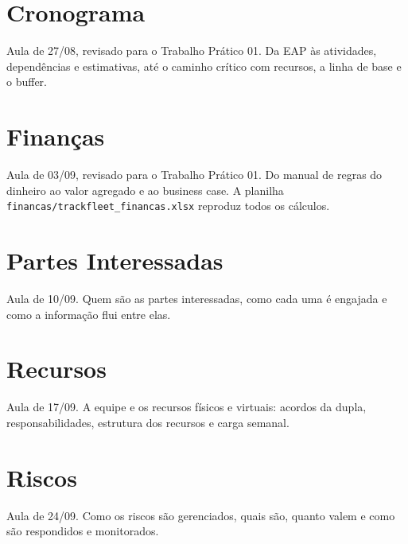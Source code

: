 \documentclass[11pt,a4paper]{report}
\newcommand{\subdocumento}[1]{\begingroup\let\section\subsection\let\subsection\subsubsection\endgroup}
\begin{document}


\chapter{Cronograma}\label{cap:cronograma}
\noindent Aula de 27/08, revisado para o Trabalho Prático 01. Da EAP às atividades, dependências e estimativas, até o caminho crítico com recursos, a linha de base e o buffer.



\chapter{Finanças}\label{cap:financas}
\noindent Aula de 03/09, revisado para o Trabalho Prático 01. Do manual de regras do dinheiro ao valor agregado e ao business case. A planilha \texttt{financas/trackfleet\_financas.xlsx} reproduz todos os cálculos.



\chapter{Partes Interessadas}\label{cap:partes}
\noindent Aula de 10/09. Quem são as partes interessadas, como cada uma é engajada e como a informação flui entre elas.
\subdocumento{../partes_interessadas/registro_das_partes_interessadas}
\subdocumento{../partes_interessadas/plano_de_engajamento}
\subdocumento{../partes_interessadas/plano_de_comunicacoes}

\chapter{Recursos}\label{cap:recursos}
\noindent Aula de 17/09. A equipe e os recursos físicos e virtuais: acordos da dupla, responsabilidades, estrutura dos recursos e carga semanal.
\subdocumento{../recursos/termo_da_equipe}
\subdocumento{../recursos/matriz_raci}
\subdocumento{../recursos/estrutura_analitica_dos_recursos}
\subdocumento{../recursos/estimativa_e_histograma}

\chapter{Riscos}\label{cap:riscos}
\noindent Aula de 24/09. Como os riscos são gerenciados, quais são, quanto valem e como são respondidos e monitorados.
\subdocumento{../riscos/plano_de_gerenciamento_dos_riscos}
\subdocumento{../riscos/registro_de_riscos}
\subdocumento{../riscos/analise_e_respostas}
\end{document}
